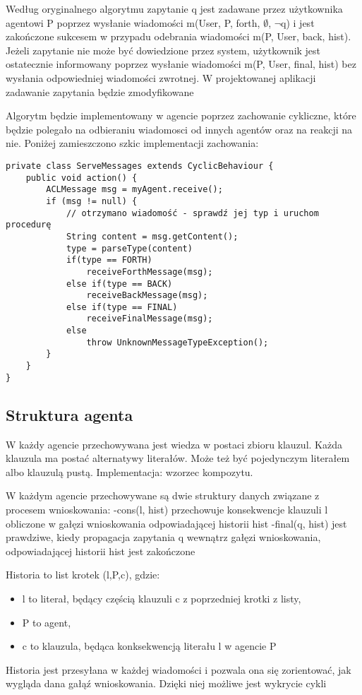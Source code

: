 \documentclass[a4paper,12pt]{mwart}
\begin{document}
Według oryginalnego algorytmu zapytanie q jest zadawane przez użytkownika agentowi P poprzez wysłanie wiadomości m(User, P, forth, $\emptyset$, $\neg$q) i jest zakończone sukcesem w przypadu odebrania wiadomości m(P, User, back, hist). Jeżeli zapytanie nie może być dowiedzione przez system, użytkownik jest ostatecznie informowany poprzez wysłanie wiadomości m(P, User, final, hist) bez wysłania odpowiedniej wiadomości zwrotnej. W projektowanej aplikacji zadawanie zapytania będzie zmodyfikowane

Algorytm będzie implementowany w agencie poprzez zachowanie cykliczne, które będzie polegało na odbieraniu wiadomosci od innych agentów oraz na reakcji na nie. Poniżej zamieszczono szkic implementacji zachowania:
\begin{verbatim}
private class ServeMessages extends CyclicBehaviour {
    public void action() {
        ACLMessage msg = myAgent.receive();
        if (msg != null) {
            // otrzymano wiadomość - sprawdź jej typ i uruchom procedurę
            String content = msg.getContent();
            type = parseType(content)
            if(type == FORTH)
                receiveForthMessage(msg);
            else if(type == BACK)
                receiveBackMessage(msg);
            else if(type == FINAL)
                receiveFinalMessage(msg);
            else
                throw UnknownMessageTypeException();
        }
    }
}
\end{verbatim}
\subsection{Struktura agenta}
W każdy agencie przechowywana jest wiedza w postaci zbioru klauzul.
Każda klauzula ma postać alternatywy literałów. Może też być pojedynczym literałem albo klauzulą pustą.
Implementacja: wzorzec kompozytu.

W każdym agencie przechowywane są dwie struktury danych związane z procesem wnioskowania:
-cons(l, hist) przechowuje konsekwencje klauzuli l obliczone w gałęzi wnioskowania odpowiadającej historii hist
-final(q, hist) jest prawdziwe, kiedy propagacja zapytania q wewnątrz gałęzi wnioskowania, odpowiadającej historii hist jest zakończone

Historia to list krotek (l,P,c), gdzie:
\begin{itemize}
\item l to literał, będący częścią klauzuli c z poprzedniej krotki z listy,
\item P to agent,
\item c to klauzula, będąca konksekwencją literału l w agencie P
\end{itemize}
Historia jest przesyłana w każdej wiadomości i pozwala ona się zorientować, jak wygląda dana gałąź wnioskowania. Dzięki niej możliwe jest wykrycie cykli
\end{document}
